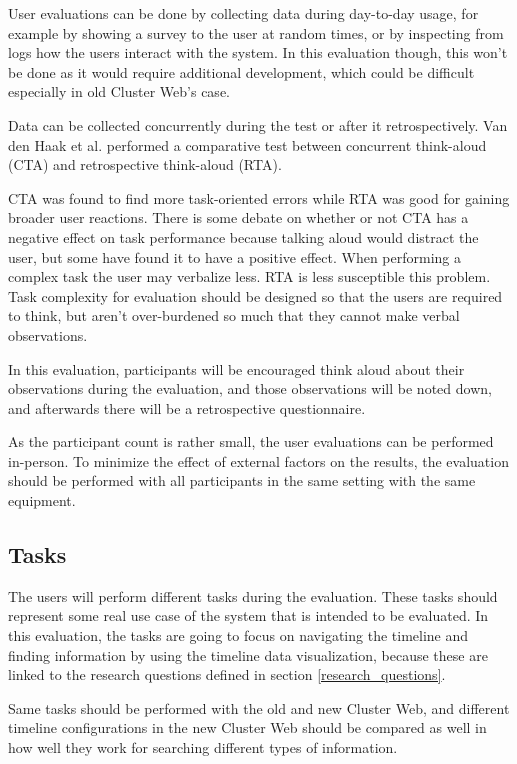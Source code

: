 User evaluations can be done by collecting data during day-to-day usage, for example by showing a survey to the user at random times, or by inspecting from logs how the users interact with the system. \cite{bevanevaluation} In this evaluation though, this won't be done as it would require additional development, which could be difficult especially in old Cluster Web's case.

Data can be collected concurrently during the test or after it retrospectively. Van den Haak et al. performed a comparative test between concurrent think-aloud (CTA) and retrospective think-aloud (RTA).

CTA was found to find more task-oriented errors while RTA was good for gaining broader user reactions. There is some debate on whether or not CTA has a negative effect on task performance because talking aloud would distract the user, but some have found it to have a positive effect. When performing a complex task the user may verbalize less. RTA is less susceptible this problem. Task complexity for evaluation should be designed so that the users are required to think, but aren't over-burdened so much that they cannot make verbal observations.
\cite{van2003retrospective}

In this evaluation, participants will be encouraged think aloud about their observations during the evaluation, and those observations will be noted down, and afterwards there will be a retrospective questionnaire.

As the participant count is rather small, the user evaluations can be performed in-person. To minimize the effect of external factors on the results, the evaluation should be performed with all participants in the same setting with the same equipment.

\subsection{Tasks}
The users will perform different tasks during the evaluation. These tasks should represent some real use case of the system that is intended to be evaluated. In this evaluation, the tasks are going to focus on navigating the timeline and finding information by using the timeline data visualization, because these are linked to the research questions defined in section \ref{research_questions}.

Same tasks should be performed with the old and new Cluster Web, and different timeline configurations in the new Cluster Web should be compared as well in how well they work for searching different types of information.

